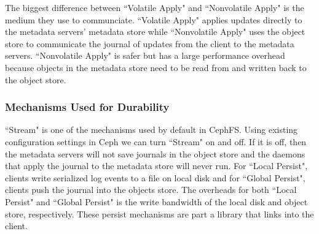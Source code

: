 The biggest difference between ``Volatile Apply" and ``Nonvolatile Apply" is
the medium they use to communciate. ``Volatile Apply" applies updates directly
to the metadata servers' metadata store while ``Nonvolatile Apply" uses the
object store to communicate the journal of updates from the client to the
metadata servers.  ``Nonvolatile Apply" is safer but has a large performance
overhead because objects in the metadata store need to be read from and written
back to the object store.


\subsubsection{Mechanisms Used for Durability} ``Stream" is one of the
mechanisms used by default in CephFS.  Using existing configuration settings in
Ceph we can turn ``Stream" on and off.  If it is off, then the metadata servers
will not save journals in the object store and the daemons that apply the
journal to the metadata store will never run.  For ``Local Persist", clients
write serialized log events to a file on local disk and for ``Global Persist",
clients push the journal into the objects store. The overheads for both ``Local
Persist" and ``Global Persist" is the write bandwidth of the local disk and
object store, respectively.  These persist mechanisms are part a library that
links into the client.

